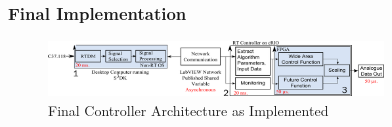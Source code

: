 \documentclass[conference]{IEEEtran}
\begin{document}
\subsubsection{Final Implementation}
\begin{figure}[htb]
\centering
\includegraphics[width=3.5in]{Final_RT_Arch.png} 
\vspace{-0.5em}
\caption{Final Controller Architecture as Implemented}
\label{Final_arch}
\end{figure}
\end{document}
